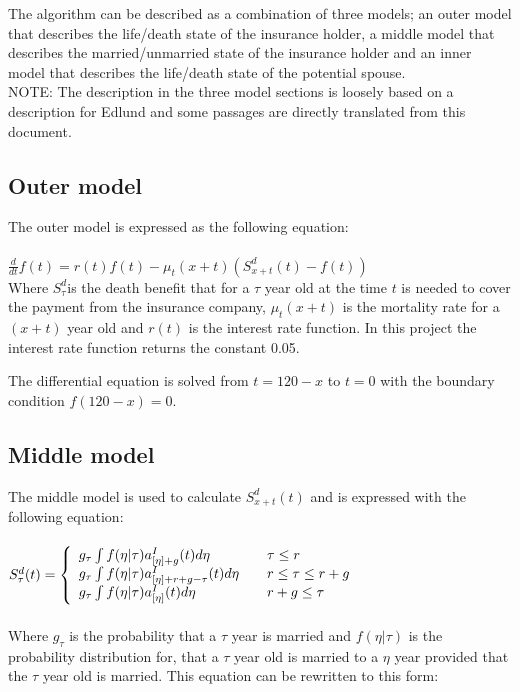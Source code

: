 The algorithm can be described as a combination of three models; an outer model that describes the life/death state of the insurance holder, a middle model that describes the married/unmarried state of the insurance holder and an inner model that describes the life/death state of the potential spouse. \\

NOTE: The description in the three model sections is loosely based on a description for Edlund\cite{edlu} and some passages are directly translated from this document.

\subsection{Outer model}
The outer model is expressed as the following equation:
\\ \\$\frac{d}{dt} f(t) = r(t) f(t) - \mu_t(x+t) (S_{x+t}^d (t) - f(t))$ \\

Where $S_\tau^d$is the death benefit that for a $\tau$ year old at the time $t$ is needed to cover the payment from the insurance company, $\mu_t(x+t)$ is the mortality rate for a $(x + t)$ year old and $r(t)$ is the interest rate function. In this project the interest rate function returns the constant 0.05.

The differential equation is solved from $t=120-x$ to $t=0$ with the boundary condition $f(120-x)=0$.

\subsection{Middle model}
The middle model is used to calculate $S_{x+t}^d (t)$ and is expressed with the following equation: \\ \\
$S_\tau^d(t) = \left\{ 
  \begin{array}{l l}
    	g_\tau \int	f(\eta|\tau)a_{[\eta] + g}^I(t)d\eta									& \quad \text{$\tau \le r$}\\
    	g_\tau \int	f(\eta|\tau)a_{[\eta] + r + g - \tau}^I(t)d\eta 			& \quad \text{$r \leq \tau \le r + g$}\\
			g_\tau \int	f(\eta|\tau)a_{[\eta]}^I(t)d\eta 											& \quad \text{$r +g \leq \tau$}
  \end{array} \right.$ \\ \\

Where $g_\tau$ is the probability that a $\tau$ year is married and $f(\eta|\tau)$ is the probability distribution for, that a $\tau$ year old is married to a $\eta$ year provided that the $\tau$ year old is married.
This equation can be rewritten to this form: \\

